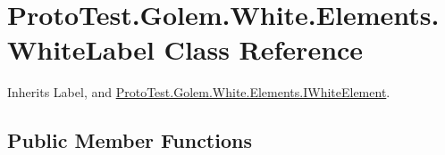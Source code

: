 \hypertarget{class_proto_test_1_1_golem_1_1_white_1_1_elements_1_1_white_label}{\section{Proto\-Test.\-Golem.\-White.\-Elements.\-White\-Label Class Reference}
\label{class_proto_test_1_1_golem_1_1_white_1_1_elements_1_1_white_label}
}


Inherits Label, and \hyperlink{interface_proto_test_1_1_golem_1_1_white_1_1_elements_1_1_i_white_element}{Proto\-Test.\-Golem.\-White.\-Elements.\-I\-White\-Element}.

\subsection*{Public Member Functions}
